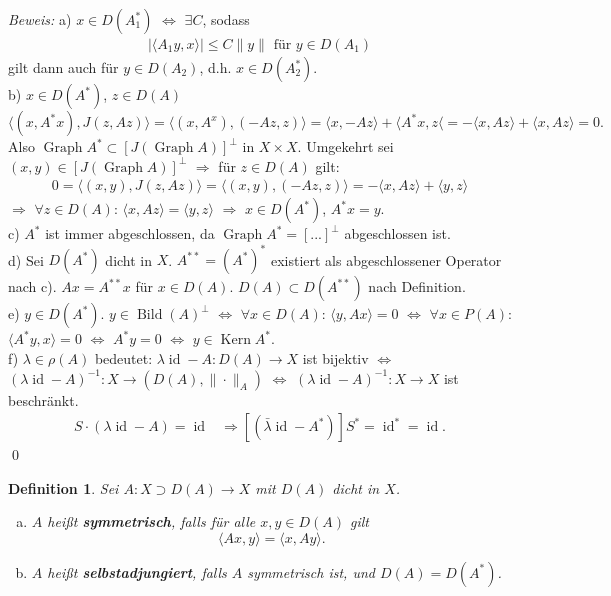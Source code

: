 \documentclass[12pt]{extreport} %
\newtheorem{Definition}[Satz]{Definition}
\DeclareMathOperator{\Kern}{Kern}
\DeclareMathOperator{\Bild}{Bild}
\DeclareMathOperator{\id}{id}
\DeclareMathOperator{\Graph}{Graph}
\numberwithin{equation}{section}
\newcommand{\m}{\cdot}
\newcommand{\Bew}{\emph{Beweis: }}
\begin{document}
\Bew a) $x\in D(A_1^*)$ $\Leftrightarrow$ $\exists C$, sodass
\begin{align*}
	|\langle A_1y,x\rangle| \leq C\|y\| \text{ für } y\in D(A_1)
\end{align*}
gilt dann auch für $y\in D(A_2)$, d.h. $x\in D(A_2^*)$.\\
b) $x\in D(A^*)$, $z\in D(A)$
$$\langle(x, A^* x), J(z,Az)\rangle = \langle (x,A^x), (-Az, z)\rangle = \langle x,-Az\rangle + \langle A^*x, z\langle = - \langle x,Az\rangle + \langle x,Az\rangle = 0.$$
Also $\Graph A^*\subset [J(\Graph A)]^\perp$ in $X\times X$. Umgekehrt sei $(x,y)\in [J(\Graph A)]^\perp$ $\Rightarrow$ für $z\in D(A)$ gilt:
\begin{align*}
	0 = \langle (x,y), J(z, Az)\rangle = \langle (x,y), (-Az, z)\rangle = -\langle x, Az\rangle + \langle y,z\rangle
\end{align*}
$\Rightarrow$ $\forall z\in D(A)$: $\langle x, Az\rangle = \langle y,z\rangle$ $\Rightarrow$ $x\in D(A^*)$, $A^*x = y$.\\
c) $A^*$ ist immer abgeschlossen, da $\Graph A^* = [...]^\perp$ abgeschlossen ist.\\
d) Sei $D(A^*)$ dicht in $X$. $A^{**} = (A^*)^*$  existiert als abgeschlossener Operator nach c). $Ax = A^{**}x$ für $x\in D(A)$. $D(A)\subset D(A^{**})$ nach Definition.\\
e) $y\in D(A^*)$. $y\in \Bild(A)^\perp$ $\Leftrightarrow$ $\forall x\in D(A)$: $\langle y,Ax\rangle = 0$ $\Leftrightarrow$ $\forall x\in P(A)$: $\langle A^*y, x\rangle = 0$ $\Leftrightarrow$ $A^* y = 0$ $\Leftrightarrow$ $y\in \Kern A^*$.\\
f) $\lambda\in \rho(A)$ bedeutet: $\lambda \id - A\colon D(A)\rightarrow X$ ist bijektiv $\Leftrightarrow$ $(\lambda\id - A)^{-1}\colon X\rightarrow (D(A),\|\m\|_A)$ $\Leftrightarrow$ $(\lambda\id - A)^{-1}\colon X\rightarrow X$ ist beschränkt.
\begin{align*}
	S\m (\lambda\id - A) = \id &\Rightarrow [(\bar \lambda\id - A^*)] S^* = \id^* = \id.
\end{align*}
\qed
	
\begin{Definition}
	Sei $A\colon X\supset D(A)\rightarrow X$ mit $D(A)$ dicht in $X$.
	\begin{enumerate}[a)]
		\item $A$ heißt \textbf{symmetrisch}, falls für alle $x,y\in D(A)$ gilt 
		$$\langle Ax,y\rangle = \langle x, Ay\rangle.$$
		\item $A$ heißt \textbf{selbstadjungiert}, falls $A$ symmetrisch ist, und $D(A) = D(A^*)$.
	\end{enumerate}
\end{Definition}
\end{document}
